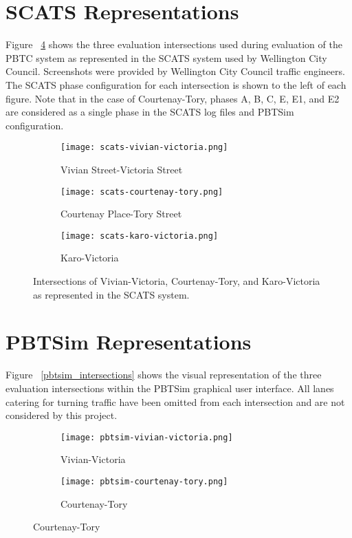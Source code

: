 \begin{appendices}
\section{SCATS Representations} 
Figure ~\ref{scats_intersections} shows the three evaluation intersections used during evaluation of the PBTC system as represented in the SCATS system used by Wellington City Council. Screenshots were provided by Wellington City Council traffic engineers. The SCATS phase configuration for each intersection is shown to the left of each figure. Note that in the case of Courtenay-Tory, phases A, B, C, E, E1, and E2 are considered as a single phase in the SCATS log files and PBTSim configuration.


\begin{figure}[]
\centering
\begin{subfigure}{.5\textwidth}
  \centering
  \texttt{[image: scats-vivian-victoria.png]}
  \caption{Vivian Street-Victoria Street}
  \label{fig:sub1}
\end{subfigure}%
\begin{subfigure}{.5\textwidth}
  \centering
  \texttt{[image: scats-courtenay-tory.png]}
  \caption{Courtenay Place-Tory Street}
  \label{fig:sub2}
\end{subfigure}

\vspace{1cm}

\begin{subfigure}{.5\textwidth}
  \centering
  \texttt{[image: scats-karo-victoria.png]}
  \caption{Karo-Victoria}
  \label{fig:sub1}
\end{subfigure}%
\caption{ Intersections of Vivian-Victoria, Courtenay-Tory, and Karo-Victoria as represented in the SCATS system. }
\label{scats_intersections}
\end{figure}

\section{PBTSim Representations}

Figure ~\ref{pbtsim_intersections} shows the visual representation of the three evaluation intersections within the PBTSim graphical user interface. All lanes catering for turning traffic have been omitted from each intersection and are not considered by this project. 

\begin{figure}[]
\centering
\begin{subfigure}{.5\textwidth}
  \centering
  \texttt{[image: pbtsim-vivian-victoria.png]}
  \caption{Vivian-Victoria}
  \label{fig:sub1}
\end{subfigure}%
\begin{subfigure}{.5\textwidth}
  \centering
  \texttt{[image: pbtsim-courtenay-tory.png]}
  \caption{Courtenay-Tory}
  \label{fig:sub2}
\end{subfigure}


\end{figure}
\end{appendices}
